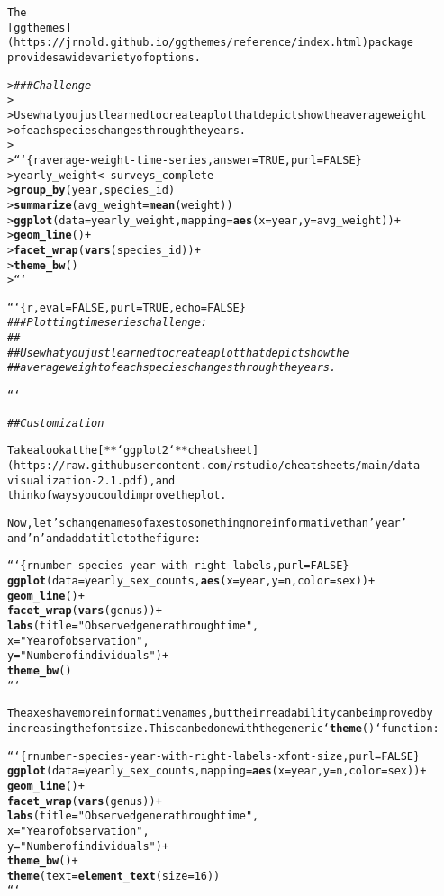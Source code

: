 \documentclass{article}\usepackage[]{graphicx}\usepackage[]{xcolor}
\makeatletter
\newcommand{\hlstr}[1]{\textcolor[rgb]{0.192,0.494,0.8}{#1}}%
\newcommand{\hlcom}[1]{\textcolor[rgb]{0.678,0.584,0.686}{\textit{#1}}}%
\newcommand{\hlkwd}[1]{\textcolor[rgb]{0.737,0.353,0.396}{\textbf{#1}}}%
\newenvironment{kframe}{%
 \def\at@end@of@kframe{}%
 \ifinner\ifhmode%
  \def\at@end@of@kframe{\end{minipage}}%
  \begin{minipage}{\columnwidth}%
 \fi\fi%
 \def\FrameCommand##1{\hskip\@totalleftmargin \hskip-\fboxsep
 \colorbox{shadecolor}{##1}\hskip-\fboxsep
     \hskip-\linewidth \hskip-\@totalleftmargin \hskip\columnwidth}%
 \MakeFramed {\advance\hsize-\width
   \@totalleftmargin\z@ \linewidth\hsize
   \@setminipage}}%
 {\par\unskip\endMakeFramed%
 \at@end@of@kframe}
\newenvironment{knitrout}{}{} %
\makeatother
\begin{document}
\begin{knitrout}
\begin{kframe}
\begin{alltt}
The
[ggthemes](https://jrnold.github.io/ggthemes/reference/index.html) package
provides a wide variety of options.

> \hlcom{### Challenge}
>
> Use what you just learned to create a plot that depicts how the average weight
> of each species changes through the years.
>
> ```\{r average-weight-time-series, answer=TRUE, purl=FALSE\}
> yearly_weight <- surveys_complete %>%
>                 \hlkwd{group_by}(year, species_id) %>%
>                  \hlkwd{summarize}(avg_weight = \hlkwd{mean}(weight))
> \hlkwd{ggplot}(data = yearly_weight, mapping = \hlkwd{aes}(x=year, y=avg_weight)) +
>    \hlkwd{geom_line}() +
>    \hlkwd{facet_wrap}(\hlkwd{vars}(species_id)) +
>    \hlkwd{theme_bw}()
> ```


```\{r, eval = FALSE, purl = TRUE, echo = FALSE\}
\hlcom{### Plotting time series challenge:}
\hlcom{##}
\hlcom{##  Use what you just learned to create a plot that depicts how the}
\hlcom{##  average weight of each species changes through the years.}

```


\hlcom{## Customization}

Take a look at the [**`ggplot2`** cheat sheet](https://raw.githubusercontent.com/rstudio/cheatsheets/main/data-visualization-2.1.pdf), and
think of ways you could improve the plot.

Now, let\hlstr{'s change names of axes to something more informative than '}year'
and \hlstr{'n'} and add a title to the figure:

```\{r number-species-year-with-right-labels, purl = FALSE\}
\hlkwd{ggplot}(data = yearly_sex_counts, \hlkwd{aes}(x = year, y = n, color = sex)) +
    \hlkwd{geom_line}() +
    \hlkwd{facet_wrap}(\hlkwd{vars}(genus)) +
    \hlkwd{labs}(title = \hlstr{"Observed genera through time"},
         x = \hlstr{"Year of observation"},
         y = \hlstr{"Number of individuals"}) +
    \hlkwd{theme_bw}()
```

The axes have more informative names, but their readability can be improved by
increasing the font size. This can be done with the generic `\hlkwd{theme}()` function:

```\{r number-species-year-with-right-labels-xfont-size, purl=FALSE\}
\hlkwd{ggplot}(data = yearly_sex_counts, mapping = \hlkwd{aes}(x = year, y = n, color = sex)) +
    \hlkwd{geom_line}() +
    \hlkwd{facet_wrap}(\hlkwd{vars}(genus)) +
    \hlkwd{labs}(title = \hlstr{"Observed genera through time"},
        x = \hlstr{"Year of observation"},
        y = \hlstr{"Number of individuals"}) +
    \hlkwd{theme_bw}() +
    \hlkwd{theme}(text=\hlkwd{element_text}(size = 16))
```


\end{alltt}
\end{kframe}
\end{knitrout}
\end{document}
